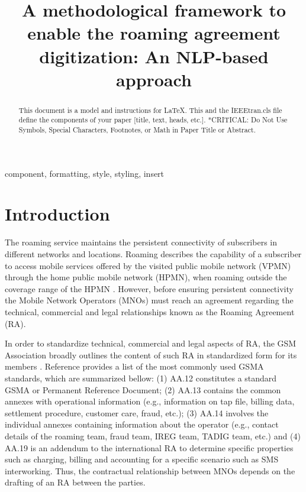 \documentclass[conference]{style/IEEEtran}
\begin{document}
\title{A methodological framework to enable the roaming agreement digitization: An NLP-based approach\\}

\maketitle

\begin{abstract}
This document is a model and instructions for \LaTeX.
This and the IEEEtran.cls file define the components of your paper [title, text, heads, etc.]. *CRITICAL: Do Not Use Symbols, Special Characters, Footnotes, 
or Math in Paper Title or Abstract.
\end{abstract}

\begin{IEEEkeywords}
component, formatting, style, styling, insert
\end{IEEEkeywords}

\section{Introduction}
The roaming service maintains the persistent connectivity of subscribers in different networks and locations. Roaming describes the capability of a subscriber to access mobile services offered by the visited public mobile network (VPMN) through the home public mobile network (HPMN), when roaming outside the coverage range of the HPMN \cite{b1}. However, before ensuring persistent connectivity the Mobile Network Operators (MNOs) must reach an agreement regarding the technical, commercial and legal relationships known as the Roaming Agreement (RA).

In order to standardize technical, commercial and legal aspects of RA, the GSM Association broadly outlines the content of such RA in standardized form for its members \cite{b2}. Reference \cite{b3} provides a list of the most commonly used GSMA standards, which are summarized bellow: (1) AA.12 constitutes a standard GSMA or Permanent Reference Document; (2) AA.13 contains the common annexes with operational information (e.g., information on tap file, billing data, settlement procedure, customer care, fraud, etc.); (3) AA.14 involves the individual annexes containing information about the operator (e.g., contact details of the roaming team, fraud team, IREG team, TADIG team, etc.) and (4) AA.19 is an addendum to the international RA to determine specific properties such as charging, billing and accounting for a specific scenario such as SMS interworking. Thus, the contractual relationship between MNOs depends on the drafting of an RA between the parties.
\end{document}
